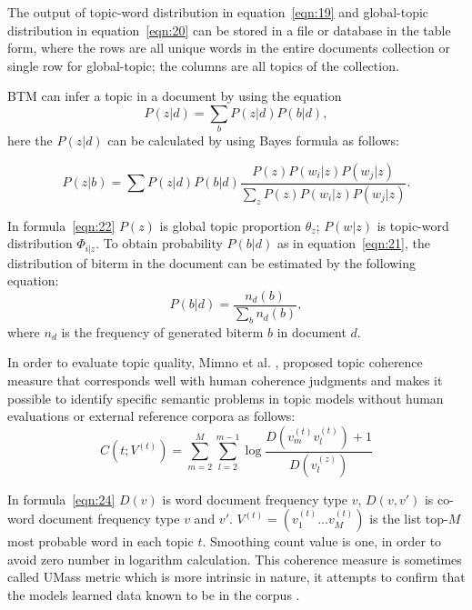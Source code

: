 The output of topic-word distribution in equation~\cref{eqn:19} and global-topic distribution in equation~\cref{eqn:20} can be stored in a file or database in the table form, where the rows are all unique words in the entire documents collection or single row for global-topic; the columns are all topics of the collection.

BTM can infer a topic in a document by using the equation
\begin{equation}
	\label{eqn:21}
	P(z \vert d) = \sum_{b}P(z \vert d)P(b \vert d),
\end{equation} here the \(P(z \vert d)\) can be calculated by using Bayes formula as follows:

\begin{equation}
	\label{eqn:22}
	P(z \vert b) = \sum P(z \vert d) P(b \vert d) \frac{P(z) P(w_i \vert z) P(w_j \vert z)}{\sum_{z} P(z) P(w_i \vert z) P(w_j \vert z)}.
\end{equation}

In formula~\cref{eqn:22} \(P(z)\) is global topic proportion \(\theta_z\); \(P(w \vert z)\) is topic-word distribution \(\Phi_{i \vert z}\). To obtain probability \(P (b \vert d)\) as in equation~\cref{eqn:21}, the distribution of biterm in the document can be estimated by the following equation:
\begin{equation}
	\label{eqn:23}
	P (b \vert d) = \frac{n_d(b)}{\sum_{b} n_d(b)},
\end{equation} where \(n_d\) is the frequency of generated biterm \(b\) in document \(d\).

In order to evaluate topic quality, Mimno et al. \cite{MimnoWallachTalley}, proposed topic coherence measure that corresponds well with human coherence judgments and makes it possible to identify specific semantic problems in topic models without human evaluations or external reference corpora as follows:
\begin{equation}
	\label{eqn:24}
	C(t; V^{(t)}) = \sum_{m = 2}^{M} \sum_{l = 2}^{m - 1} \log{\frac{D(v_m^{(t)} v_l^{(t)}) + 1}{D(v_l^{(z)})}}
\end{equation}

In formula~\cref{eqn:24} \(D(v)\) is word document frequency type \(v\), \(D(v,v')\) is co-word document frequency type \(v\) and \(v'\). \(V^{(t)} = (v_1^{(t)} \dots v_M^{(t)})\) is the list top-\(M\) most probable word in each topic \(t\). Smoothing count value is one, in order to avoid zero number in logarithm calculation. This coherence measure is sometimes called UMass metric which is more intrinsic in nature, it attempts to confirm that the models learned data known to be in the corpus \cite{StevensKegelmeyerAndrzejewski}.

